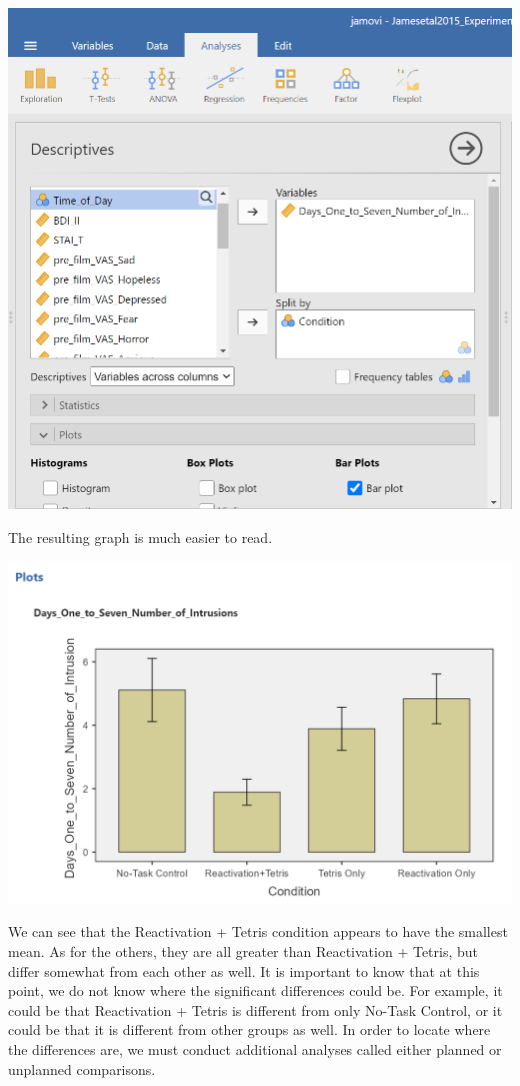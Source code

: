\documentclass[
]{book}
\begin{document}
\includegraphics{img/BarGraphCommands.png}

The resulting graph is much easier to read.

\includegraphics{img/ResultingBarGraph.png}

We can see that the Reactivation + Tetris condition appears to have the smallest mean. As for the others, they are all greater than Reactivation + Tetris, but differ somewhat from each other as well. It is important to know that at this point, we do not know where the significant differences could be. For example, it could be that Reactivation + Tetris is different from only No-Task Control, or it could be that it is different from other groups as well. In order to locate where the differences are, we must conduct additional analyses called either planned or unplanned comparisons.
\end{document}
